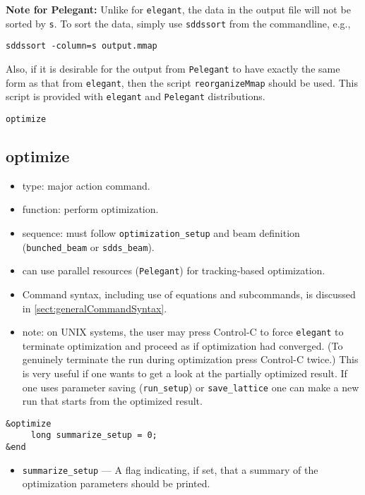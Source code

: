 \documentclass[11pt]{article}
\begin{document}
{\bf Note for Pelegant:} Unlike for {\tt elegant}, the data in the output file will not be sorted by \verb|s|.
To sort the data, simply use \verb|sddssort| from the commandline, e.g.,
\begin{verbatim}
sddssort -column=s output.mmap
\end{verbatim}
Also, if it is desirable for the output from \verb|Pelegant| to have exactly the same form as that from 
\verb|elegant|, then the script \verb|reorganizeMmap| should be used. This script is provided with 
\verb|elegant| and \verb|Pelegant| distributions.

\newpage
\begin{center}{\Large\verb|optimize|}\end{center}
\subsection{optimize \label{subsec:optimize}}

\begin{itemize}
\item type: major action command.
\item function: perform optimization.
\item sequence: must follow \verb|optimization_setup| and beam definition (\verb|bunched_beam| or \verb|sdds_beam|).
\item can use parallel resources (\verb|Pelegant|) for tracking-based optimization.
\item Command syntax, including use of equations and subcommands, is discussed in \ref{sect:generalCommandSyntax}.
\item note: on UNIX systems, the user may press Control-C to force
\verb|elegant| to terminate optimization and proceed as if
optimization had converged.  (To genuinely terminate the run during
optimization press Control-C twice.) This is very useful if one wants
to get a look at the partially optimized result.  If one uses parameter
saving (\verb|run_setup|) or \verb|save_lattice| one can make a new
run that starts from the optimized result.
\end{itemize}

\begin{verbatim}
&optimize
     long summarize_setup = 0;
&end
\end{verbatim}

\begin{itemize}

\item \verb|summarize_setup| --- A flag indicating, if set, that a
summary of the optimization parameters should be printed.
\end{itemize}
\end{document}
